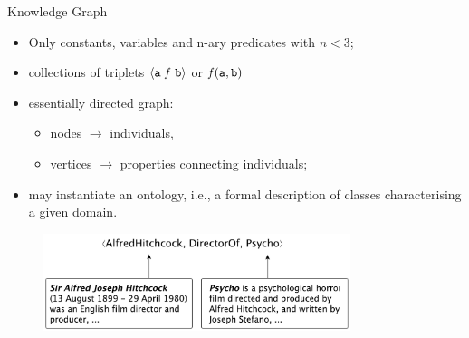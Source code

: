\documentclass[presentation]{beamer}\mode<presentation>{\usetheme{AMSBolognaFC}}
\begin{document}
\begin{frame}[allowframebreaks]{Knowledge Graph}
    
    \begin{itemize}
        \item Only constants, variables and n-ary predicates with $n < 3$;
        \item collections of triplets $\langle \mathtt{a}\ \mathit{f}\ \mathtt{b} \rangle$ or $\mathit{f}(\mathtt{a}, \mathtt{b})$
        \item essentially directed graph:
        \begin{itemize}
            \item nodes $\rightarrow$ individuals,
            \item vertices $\rightarrow$ properties connecting individuals;
        \end{itemize}
        \item may instantiate an ontology, i.e., a formal description of classes characterising a given domain.
    \end{itemize}
    
    \framebreak
    
    \begin{figure}
        \centering
        \includegraphics[width=0.8\textwidth]{figures/kg-example}
    \end{figure}    
\end{frame}    
\end{document}
